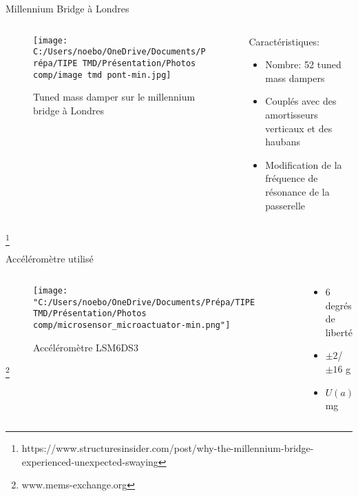 \documentclass{beamer}
\begin{document}
\begin{frame}{Millennium Bridge à Londres}
	\begin{columns}
		\begin{column}{0.5\textwidth}
			\begin{figure}
				\texttt{[image: C:/Users/noebo/OneDrive/Documents/Prépa/TIPE TMD/Présentation/Photos comp/image tmd pont-min.jpg]}
				\caption{Tuned mass damper sur le millennium bridge à Londres}
			\end{figure}
		\end{column}
		\begin{column}{0.5\textwidth}
			Caractéristiques:
			\begin{itemize}
				\item Nombre: 52 tuned mass dampers
				\item Couplés avec des amortisseurs verticaux et des haubans 
				\item Modification de la fréquence de résonance de la passerelle 
				
				
			\end{itemize}	
		\end{column}
	\end{columns}
	\footnote{\tiny https://www.structuresinsider.com/post/why-the-millennium-bridge-experienced-unexpected-swaying}
\end{frame}

	\begin{frame}{Accéléromètre utilisé}
	\begin{columns}
		\begin{column}{0.5\textwidth}
			\begin{figure}
				\texttt{[image: "C:/Users/noebo/OneDrive/Documents/Prépa/TIPE TMD/Présentation/Photos comp/microsensor\_microactuator-min.png"]}
				\caption{Accéléromètre LSM6DS3}
			\end{figure}
		\footnote{www.mems-exchange.org}
		\end{column}
		\begin{column}{0.5\textwidth}
			\begin{itemize}
				\item 6 degrés de liberté 
				\item $\pm 2$/$\pm 16$ g
				\item $U(a)=0.122$ mg 
			\end{itemize}
		\end{column}
		
	\end{columns}
	\end{frame}
\end{document}
